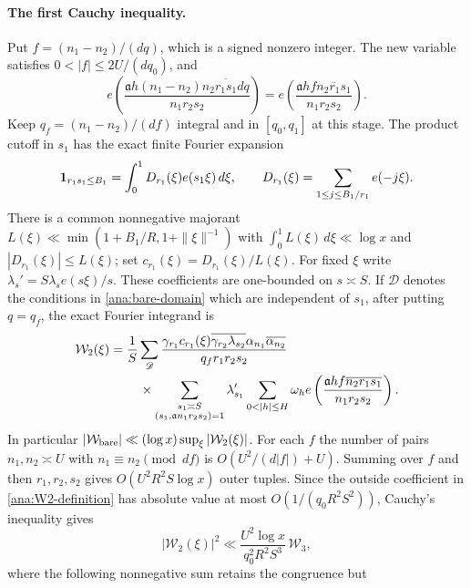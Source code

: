 \paragraph{The first Cauchy inequality.}
Put $f=(n_1-n_2)/(dq)$, which is a signed nonzero integer. The new
variable satisfies $0<|f|\le2U/(dq_0)$, and
\begin{equation}\label{ana:f-phase}
 e\left(\frac{\mathfrak{a}h(n_1-n_2)\overline{n_2r_1s_1dq}}
                    {n_1r_2s_2}\right)
 =e\left(\frac{\mathfrak{a}hf\overline{n_2r_1s_1}}
                    {n_1r_2s_2}\right).
\end{equation}
Keep $q_f=(n_1-n_2)/(df)$ integral and in $[q_0,q_1]$ at this stage.
The product cutoff in $s_1$ has the exact finite Fourier expansion
\[
 \mathbf 1_{r_1s_1\le B_1}=
 \int_0^1D_{r_1}(\xi)e(s_1\xi)\,d\xi,
 \qquad
 D_{r_1}(\xi)=\sum_{1\le j\le B_1/r_1}e(-j\xi).
\]
There is a common nonnegative majorant
$L(\xi)\ll\min(1+B_1/R,1+\|\xi\|^{-1})$ with
$\int_0^1L(\xi)\,d\xi\ll\log x$ and
$|D_{r_1}(\xi)|\le L(\xi)$; set
$c_{r_1}(\xi)=D_{r_1}(\xi)/L(\xi)$.
For fixed $\xi$ write
$\lambda_s'=S\lambda_s e(s\xi)/s$.
These coefficients are one-bounded on $s\asymp S$.
If $\mathscr D$ denotes the conditions in \eqref{ana:bare-domain}
which are independent of $s_1$, after putting $q=q_f$, the exact
Fourier integrand is
\begin{align}\label{ana:W2-definition}
 \mathcal W_2(\xi)={}&\frac1S\sum_{\mathscr D}
 \frac{\gamma_{r_1}c_{r_1}(\xi)
              \overline{\gamma_{r_2}\lambda_{s_2}}
              \alpha_{n_1}\overline{\alpha_{n_2}}}
      {q_f r_1r_2s_2}\notag\\
 &\quad\times
 \sum_{\substack{s_1\asymp S\\(s_1,\mathfrak{a}n_1r_2s_2)=1}}
 \lambda_{s_1}'\sum_{0<|h|\le H}\omega_h
 e\left(\frac{\mathfrak{a}hf\overline{n_2r_1s_1}}{n_1r_2s_2}\right).
\end{align}
In particular
$|\mathcal W_{\rm bare}|\ll(\log x)\sup_\xi|\mathcal W_2(\xi)|$.
For each $f$ the number of pairs $n_1,n_2\asymp U$ with
$n_1\equiv n_2\pmod{df}$ is
$O(U^2/(d|f|)+U)$. Summing over $f$ and then $r_1,r_2,s_2$
gives $O(U^2R^2S\log x)$ outer tuples. Since the outside
coefficient in \eqref{ana:W2-definition} has absolute value at most
$O(1/(q_0R^2S^2))$, Cauchy's inequality gives
\begin{equation}\label{ana:first-Cauchy}
 |\mathcal W_2(\xi)|^2
 \ll\frac{U^2\log x}{q_0^2R^2S^3}\,\mathcal W_3,
\end{equation}
where the following nonnegative sum retains the congruence but
